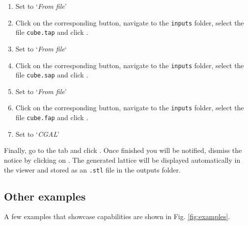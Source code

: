 \begin{enumerate}[label=\alph*)]
	\begin{enumerate}[label=\arabic*.]
		\item Set  to `\textit{From file}'
		\item Click on the corresponding  button, navigate to the \texttt{inputs} folder, select the file \texttt{cube.tap} and click  .
		\item Set  to `\textit{From file}`
		\item Click on the corresponding  button, navigate to the \texttt{inputs} folder, select the file \texttt{cube.sap} and click  .
		\item Set  to `\textit{From file}'
		\item Click on the corresponding  button, navigate to the \texttt{inputs} folder, select the file \texttt{cube.fap} and click  .
		\item Set   to `\textit{CGAL}'
	\end{enumerate}
\end{enumerate}

Finally, go to the  tab and click . Once finished you will be notified, dismiss the notice by clicking on . The generated lattice will be displayed automatically in the viewer and stored as an \texttt{.stl} file in the outputs folder.

\subsection{Other examples} \label{sec:use cases}
A few examples that showcase \asli{} capabilities are shown in Fig. \ref{fig:examples}.

